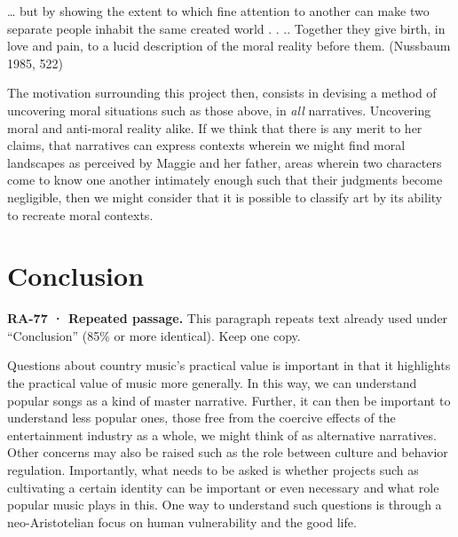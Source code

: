 \documentclass[
  letterpaper,
  DIV=11,
  numbers=noendperiod]{scrartcl}
\theoremstyle{remark}
\begin{document}
\ldots{} but by showing the extent to which fine attention to another
can make two separate people inhabit the same created world . . ..
Together they give birth, in love and pain, to a lucid description of
the moral reality before them. (Nussbaum 1985, 522)

The motivation surrounding this project then, consists in devising a
method of uncovering moral situations such as those above, in \emph{all}
narratives. Uncovering moral and anti-moral reality alike. If we think
that there is any merit to her claims, that narratives can express
contexts wherein we might find moral landscapes as perceived by Maggie
and her father, areas wherein two characters come to know one another
intimately enough such that their judgments become negligible, then we
might consider that it is possible to classify art by its ability to
recreate moral contexts.

\section{Conclusion}\label{conclusion-1}

\begin{tcolorbox}[enhanced jigsaw, arc=.35mm, bottomrule=.15mm, bottomtitle=1mm, breakable, colback=white, colbacktitle=quarto-callout-important-color!10!white, colframe=quarto-callout-important-color-frame, coltitle=black, left=2mm, leftrule=.75mm, opacityback=0, opacitybacktitle=0.6, rightrule=.15mm, title=\textcolor{quarto-callout-important-color}{\faExclamation}\hspace{0.5em}{Important}, titlerule=0mm, toprule=.15mm, toptitle=1mm]

\textbf{RA-77 · Repeated passage.} This paragraph repeats text already
used under ``Conclusion'' (85\% or more identical). Keep one copy.

\end{tcolorbox}

Questions about country music's practical value is important in that it
highlights the practical value of music more generally. In this way, we
can understand popular songs as a kind of master narrative. Further, it
can then be important to understand less popular ones, those free from
the coercive effects of the entertainment industry as a whole, we might
think of as alternative narratives. Other concerns may also be raised
such as the role between culture and behavior regulation. Importantly,
what needs to be asked is whether projects such as cultivating a certain
identity can be important or even necessary and what role popular music
plays in this. One way to understand such questions is through a
neo-Aristotelian focus on human vulnerability and the good life.
\end{document}
